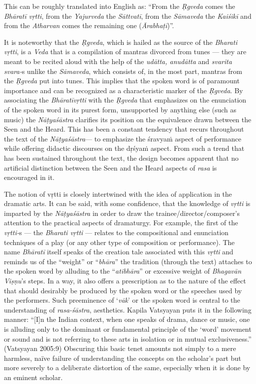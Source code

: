 This can be roughly translated into English as: “From the \textsl{Ṛgveda} comes the \textsl{Bhāratī vṛtti}, from the \textsl{Yajurveda} the \textsl{Sāttvatī}, from the \textsl{Sāmaveda} the \textsl{Kaiśikī} and from the \textsl{Atharvan} comes the remaining one (\textsl{Ārabhaṭī})”.     

It is noteworthy that the \textsl{Ṛgveda}, which is hailed as the source of the \textsl{Bharati vṛtti}, is a \textsl{Veda} that is a compilation of mantras divorced from tunes --- they are meant to be recited aloud with the help of the \textsl{udātta, anudātta} and \textsl{svarita svara-}s unlike the \textsl{Sāmaveda}, which consists of, in the most part, mantras from the \textsl{Ṛgveda} put into tunes. This implies that the spoken word is of paramount importance and can be recognized as a characteristic marker of the \textsl{Ṛgveda}. By associating the \textsl{Bhāratīvṛtti} with the \textsl{Ṛgveda} that emphasizes on the enunciation of the spoken word in its purest form, unsupported by anything else (such as music) the \textsl{Nāṭyaśāstra} clarifies its position on the equivalence drawn between the Seen and the Heard. This has been a constant tendency that recurs throughout the text of the \textsl{Nāṭyaśāstra}--- to emphasize the śravyaṁ aspect of performance while offering didactic discourses on the dṛśyaṁ aspect. From such a trend that has been sustained throughout the text, the design becomes apparent that no artificial distinction between the Seen and the Heard aspects of \textsl{rasa} is encouraged in it. 

The notion of vṛtti is closely intertwined with the idea of application in the dramatic arts. It can be said, with some confidence, that the knowledge of \textsl{vṛtti} is imparted by the \textsl{Nāṭyaśāstra} in order to draw the trainee/director/composer’s attention to the practical aspects of dramaturgy. For example, the first of the \textsl{vṛtti-}s --- the \textsl{Bharati vṛtti} --- relates to the compositional and enunciation techniques of a play (or any other type of composition or performance). The name \textsl{Bhāratī} itself speaks of the creation tale associated with this \textsl{vṛtti} and reminds us of the “weight” or “\textsl{bhāra}” the tradition (through the text) attaches to the spoken word by alluding to the “\textsl{atibhāra}” or excessive weight of \textsl{Bhagavān Viṣṇu}’s steps. In a way, it also offers a prescription as to the nature of the effect that should desirably be produced by the spoken word or the speeches used by the performers. Such preeminence of ‘\textsl{vāk}’ or the spoken word is central to the understanding of \textsl{rasa-śāstra}, aesthetics. Kapila Vatsyayan puts it in the following manner: “[I]n the Indian context, when one speaks of drama, dance or music, one is alluding only to the dominant or fundamental principle of the ‘word’ movement or sound and is not referring to these arts in isolation or in mutual exclusiveness.” (Vatsyayan 2005:9) Obscuring this basic tenet amounts not simply to a mere harmless, naïve failure of understanding the concepts on the scholar’s part but more severely to a deliberate distortion of the same, especially when it is done by an eminent scholar.\\[-21pt]       

